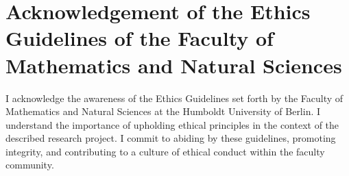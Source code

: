 \documentclass[letterpaper]{article}
\begin{document}
\section{Acknowledgement of the Ethics Guidelines of the Faculty of Mathematics and Natural Sciences}
I acknowledge the awareness of the Ethics Guidelines set forth by the Faculty of Mathematics and Natural Sciences at the Humboldt University of Berlin. I understand the importance of upholding ethical principles in the context of the described research project. I commit to abiding by these guidelines, promoting integrity, and contributing to a culture of ethical conduct within the faculty community.



 
\end{document}
